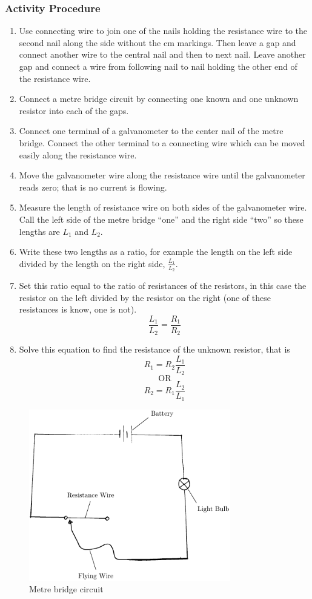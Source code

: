 \subsubsection*{Activity Procedure}
\begin{enumerate}
\item{Use connecting wire to join one of the nails holding the resistance wire to the second nail along the side without the cm markings. Then leave a gap and connect another wire to the central nail and then to next nail. Leave another gap and connect a wire from following nail to nail holding the other end of the resistance wire.} 
\item{Connect a metre bridge circuit by connecting one known and one unknown resistor into each of the gaps.} 
\item{Connect one terminal of a galvanometer to the center nail of the metre bridge. Connect the other terminal to a connecting wire which can be moved easily along the resistance wire.} 
\item{Move the galvanometer wire along the resistance wire until the galvanometer reads zero; that is no current is flowing.} 
\item{Measure the length of resistance wire on both sides of the galvanometer wire. Call the left side of the metre bridge ``one'' and the right side ``two'' so these lengths are $L_1$ and $L_2$.} 
\item{Write these two lengths as a ratio, for example the length on the left side divided by the length on the right side, $\frac{L_1}{L_2}$.} 
\item{Set this ratio equal to the ratio of resistances of the resistors, in this case the resistor on the left divided by the resistor on the right (one of these resistances is know, one is not).
$$ \frac{L_1}{L_2} = \frac{R_1}{R_2} $$ 
}
\item{Solve this equation to find the resistance of the unknown resistor, that is $$ R_1 = R_2 \frac{L_1}{L_2} $$ $$\mathrm{OR}$$ $$ R_2 = R_1 \frac{L_2}{L_1} $$
} 
\end{enumerate}

\begin{figure}
\begin{center}
\includegraphics{./img/ohm's-law.png}
\caption{Metre bridge circuit}
\label{fig:ohm's-law}
\end{center}
\end{figure}

